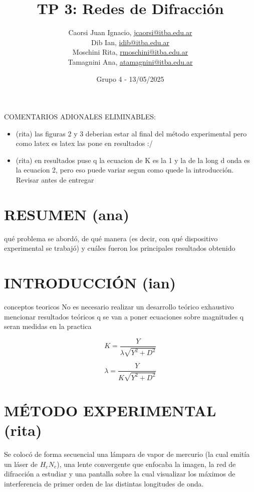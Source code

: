 \documentclass[12pt, a4paper]{article}
\title{TP 3: Redes de Difracción}
\author
{
  Caorsi Juan Ignacio, \href{jcaorsi@itba.edu.ar}{jcaorsi@itba.edu.ar} \\
  Dib Ian, \href{idib@itba.edu.ar}{idib@itba.edu.ar} \\
  Moschini Rita, \href{rmoschini@itba.edu.ar}{rmoschini@itba.edu.ar} \\
  Tamagnini Ana, \href{atamagnini@itba.edu.ar}{atamagnini@itba.edu.ar}
}
\date{Grupo 4 - 13/05/2025}
\begin{document}
\maketitle

COMENTARIOS ADIONALES ELIMINABLES:
\begin{itemize}
    \item (rita) las figuras 2 y 3 deberian estar al final del método experimental pero como latex es latex las pone en resultados :/
    \item (rita) en resultados puse q la ecuacion de K es la 1 y la de la long d onda es la ecuacion 2, pero eso puede variar segun como quede la introducción. Revisar antes de entregar
\end{itemize}

\section{RESUMEN (ana)}
qué problema se abordó, de qué manera (es decir, con qué dispositivo experimental se trabajó) y cuáles fueron los principales resultados obtenido

\section{INTRODUCCIÓN (ian)}
conceptos teoricos
No es necesario realizar un desarrollo teórico exhaustivo
mencionar resultados teóricos q se van a poner
ecuaciones sobre magnitudes q seran medidas en la practica

\begin{equation}
  K = \frac{Y}{{\lambda} \sqrt{Y^{2} + D^{2}}}
\label{equation5}
\end{equation} 

\begin{equation}
  {\lambda} = \frac{Y}{K \sqrt{Y^{2} + D^{2}}}
\label{equation5}
\end{equation}

\section{MÉTODO EXPERIMENTAL (rita)}
Se colocó de forma secuencial una lámpara de vapor de mercurio (la cual emitía un láser de $H_{e}N_{e}$), una lente convergente que enfocaba la imagen, la red de difracción a estudiar y una pantalla sobre la cual visualizar los máximos de interferencia de primer orden de las distintas longitudes de onda.
\end{document}
